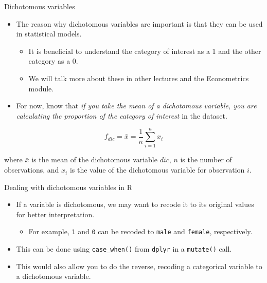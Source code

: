 \documentclass[
  10pt,
  ignorenonframetext,
]{beamer}
\providecommand{\tightlist}{%
  \setlength{\itemsep}{0pt}\setlength{\parskip}{0pt}}\usepackage{longtable,booktabs,array}
\begin{document}
\begin{frame}{Dichotomous variables}
\label{dichotomous-variables-1}
\begin{itemize}
\tightlist
\item
  The reason why dichotomous variables are important is that they can be
  used in statistical models.

  \begin{itemize}
  \tightlist
  \item
    It is beneficial to understand the category of interest as a 1 and
    the other category as a 0.
  \item
    We will talk more about these in other lectures and the Econometrics
    module.
  \end{itemize}
\item
  For now, know that \emph{if you take the mean of a dichotomous
  variable, you are calculating the proportion of the category of
  interest} in the dataset.
\end{itemize}

\[ f_{dic} = \bar{x} = \frac{1}{n} \sum_{i=1}^{n} x_i \]

where \(\bar{x}\) is the mean of the dichotomous variable \(dic\), \(n\)
is the number of observations, and \(x_i\) is the value of the
dichotomous variable for observation \(i\).
\end{frame}

\begin{frame}[fragile]{Dealing with dichotomous variables in R}
\label{dealing-with-dichotomous-variables-in-r}
\begin{itemize}
\item
  If a variable is dichotomous, we may want to recode it to its original
  values for better interpretation.

  \begin{itemize}
  \tightlist
  \item
    For example, \texttt{1} and \texttt{0} can be recoded to
    \texttt{male} and \texttt{female}, respectively.
  \end{itemize}
\item
  This can be done using \texttt{case\_when()} from \texttt{dplyr} in a
  \texttt{mutate()} call.
\item
  This would also allow you to do the reverse, recoding a categorical
  variable to a dichotomous variable.
\end{itemize}
\end{frame}
\end{document}
